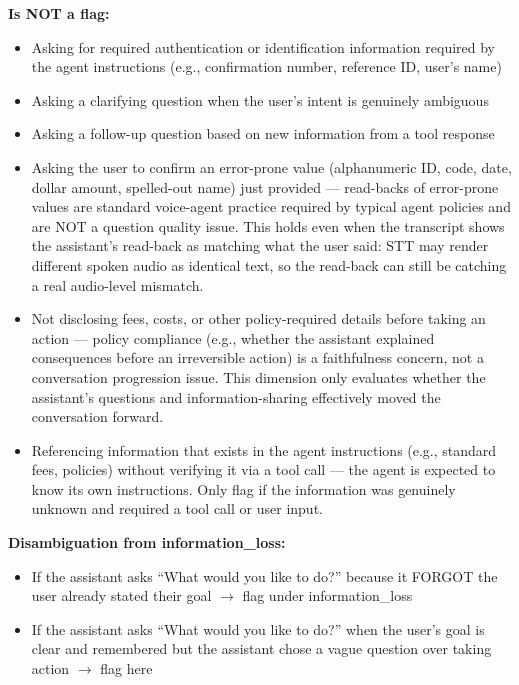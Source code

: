 \begin{tcolorbox}[promptbox, title={\small Conversation Progression Prompt}]
      \textbf{Is NOT a flag:}
      \begin{itemize}
        \item Asking for required authentication or identification information required by the agent instructions (e.g., confirmation number, reference ID, user's name)
        \item Asking a clarifying question when the user's intent is genuinely ambiguous
        \item Asking a follow-up question based on new information from a tool response
        \item Asking the user to confirm an error-prone value (alphanumeric ID, code, date, dollar amount, spelled-out name) just provided --- read-backs of error-prone values are standard voice-agent practice required by typical agent policies and are NOT a question quality issue. This holds even when the transcript shows the assistant's read-back as matching what the user said: STT may render different spoken audio as identical text, so the read-back can still be catching a real audio-level mismatch.
        \item Not disclosing fees, costs, or other policy-required details before taking an action --- policy compliance (e.g., whether the assistant explained consequences before an irreversible action) is a faithfulness concern, not a conversation progression issue. This dimension only evaluates whether the assistant's questions and information-sharing effectively moved the conversation forward.
        \item Referencing information that exists in the agent instructions (e.g., standard fees, policies) without verifying it via a tool call --- the agent is expected to know its own instructions. Only flag if the information was genuinely unknown and required a tool call or user input.
      \end{itemize}

      \textbf{Disambiguation from information\_loss:}
      \begin{itemize}
        \item If the assistant asks ``What would you like to do?'' because it FORGOT the user already stated their goal $\rightarrow$ flag under information\_loss
        \item If the assistant asks ``What would you like to do?'' when the user's goal is clear and remembered but the assistant chose a vague question over taking action $\rightarrow$ flag here
      \end{itemize}


\end{tcolorbox}
